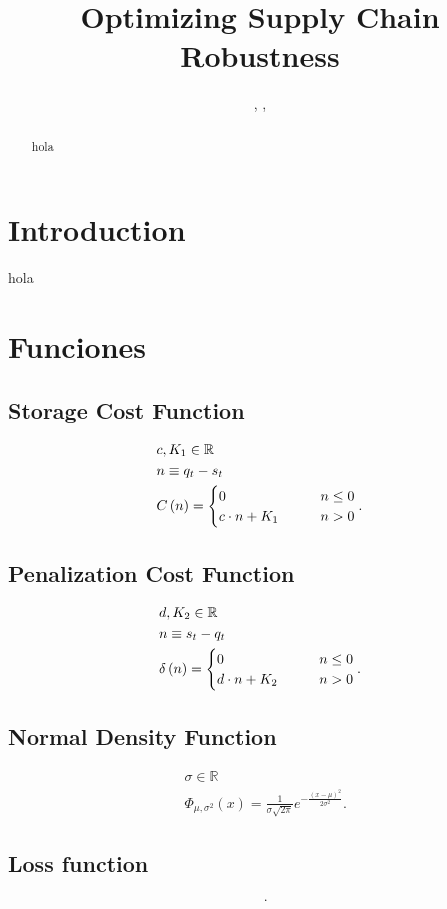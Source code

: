 \documentclass{OptiFlow}
\begin{document}

\title{Optimizing Supply Chain Robustness}

\author{, , }

\address{
}

\begin{abstract}
hola	
\end{abstract}

\maketitle

\section{Introduction}\label{sec1}
hola


\section{Funciones}
\subsection{Storage Cost Function}
\begin{align*}
	&c, K_1 \in \mathbb{R}\\
	&n \equiv q_t - s_t\\
	&C\left( n \right) =  \begin{cases}
		0 \text{\qquad} &n \le  0\\
		c\cdot n +K_1 \text{\qquad} &n>0
	\end{cases}  
.\end{align*}

\subsection{Penalization Cost Function}
\begin{align*}
	&d,K_2 \in  \mathbb{R}\\
	&n \equiv s_t - q_t\\
	&\delta\left( n \right) = \begin{cases}
		0 \text{\qquad} &n \le  0\\
		d\cdot n + K_2 \text{\qquad} &n > 0
	\end{cases}
.\end{align*}

\subsection{Normal Density Function}
\begin{align*}
	&\sigma \in \mathbb{R}\\
	&\Phi_{\mu, \sigma^2}\left( x \right)   = \frac{1}{\sigma \sqrt{2\pi} }e^{- \frac{\left( x-\mu \right) ^2}{2 \sigma^2}}
.\end{align*}


\subsection{Loss function}
\begin{align*}
	&
.\end{align*}
\end{document}
